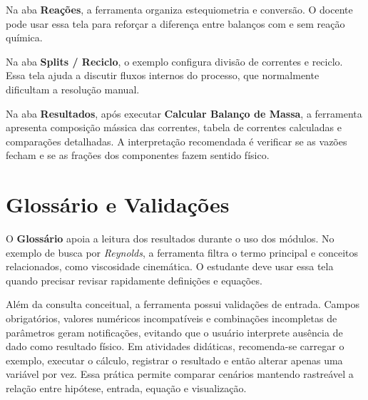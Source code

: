 Na aba \textbf{Reações}, a ferramenta organiza estequiometria e conversão. O docente pode usar essa tela para reforçar a diferença entre balanços com e sem reação química.


Na aba \textbf{Splits / Reciclo}, o exemplo configura divisão de correntes e reciclo. Essa tela ajuda a discutir fluxos internos do processo, que normalmente dificultam a resolução manual.


Na aba \textbf{Resultados}, após executar \textbf{Calcular Balanço de Massa}, a ferramenta apresenta composição mássica das correntes, tabela de correntes calculadas e comparações detalhadas. A interpretação recomendada é verificar se as vazões fecham e se as frações dos componentes fazem sentido físico.


\section{Glossário e Validações}

O \textbf{Glossário} apoia a leitura dos resultados durante o uso dos módulos. No exemplo de busca por \textit{Reynolds}, a ferramenta filtra o termo principal e conceitos relacionados, como viscosidade cinemática. O estudante deve usar essa tela quando precisar revisar rapidamente definições e equações.


Além da consulta conceitual, a ferramenta possui validações de entrada. Campos obrigatórios, valores numéricos incompatíveis e combinações incompletas de parâmetros geram notificações, evitando que o usuário interprete ausência de dado como resultado físico. Em atividades didáticas, recomenda-se carregar o exemplo, executar o cálculo, registrar o resultado e então alterar apenas uma variável por vez. Essa prática permite comparar cenários mantendo rastreável a relação entre hipótese, entrada, equação e visualização.

